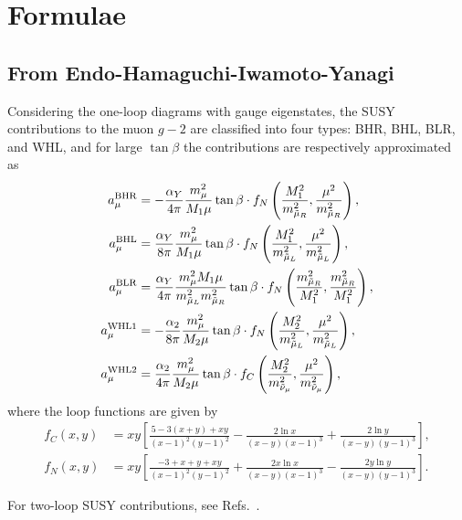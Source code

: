\documentclass[a4paper,10pt,captions=tableheading,DIV=14]{scrartcl}
\numberwithin{equation}{section}
\newcommand\amu[1][\relax]{\ifx#1\relax{a_\mu}\else{a_\mu^{\mathrm{#1}}}\fi}
\begin{document}
\clearpage
\appendix
\section{Formulae}
\subsection{From Endo-Hamaguchi-Iwamoto-Yanagi}
Considering the one-loop diagrams with gauge eigenstates, the SUSY contributions to the muon $g-2$ are classified into four types: BHR, BHL, BLR, and WHL, and for large $\tan\beta$ the contributions are respectively approximated as~\cite{Moroi:1995yh}
\begin{align}
  \amu[BHR]
  &= - \frac{\alpha_Y}{4\pi} \frac{m_{\mu}^2}{M_1\mu} \tan\beta\cdot
    f_N\left(\frac{M_1^2}{m_{\tilde{\mu}_R}^2}, \frac{\mu^2}{m_{\tilde{\mu}_R}^2} \right),
    \label{eq:BHR} \\
  \amu[BHL]
  &= \frac{\alpha_Y}{8\pi} \frac{m_{\mu}^2}{M_1\mu} \tan\beta\cdot
    f_N\left(\frac{M_1^2}{m_{\tilde{\mu}_L}^2}, \frac{\mu^2}{m_{\tilde{\mu}_L}^2} \right),
    \label{eq:BHL}\\
  \amu[BLR]
  &= \frac{\alpha_Y}{4\pi} \frac{m_{\mu}^2M_1\mu}{m_{\tilde{\mu}_L}^2m_{\tilde{\mu}_R}^2}
    \tan\beta\cdot
    f_N\left(\frac{m_{\tilde{\mu}_R}^2}{M_1^2}, \frac{m_{\tilde{\mu}_R}^2}{M_1^2} \right),
    \label{eq:BLR} \\
  \amu[WHL1]
  &= -\frac{\alpha_2}{8\pi} \frac{m_{\mu}^2}{M_2\mu} \tan\beta\cdot
    f_N\left(\frac{M_2^2}{m_{\tilde{\mu}_L}^2}, \frac{\mu^2}{m_{\tilde{\mu}_L}^2} \right),
    \label{eq:WHL1}\\
  \amu[WHL2]
  &= \frac{\alpha_2}{4\pi} \frac{m_{\mu}^2}{M_2\mu} \tan\beta\cdot
    f_C\left(\frac{M_2^2}{m_{\tilde{\nu}_{\mu}}^2}, \frac{\mu^2}{m_{\tilde{\nu}_{\mu}}^2} \right),
    \label{eq:WHL2}
\end{align}
where the loop functions are given by
\begin{align}
    \label{eq:loop-aprox}
    f_C(x,y)
    &=xy\left[
      \frac{5-3(x+y)+xy}{(x-1)^2(y-1)^2} - \frac{2\ln x}{(x-y)(x-1)^3}+\frac{2\ln y}{(x-y)(y-1)^3}
      \right],
    \\
    f_N(x,y)
    &= xy\left[
      \frac{-3+x+y+xy}{(x-1)^2(y-1)^2} + \frac{2x\ln x}{(x-y)(x-1)^3}-\frac{2y\ln y}{(x-y)(y-1)^3}
      \right].
\end{align}

For two-loop SUSY contributions, see Refs.~\cite{Fargnoli:2013zda,Fargnoli:2013zia,Athron:2015rva}.
\end{document}
